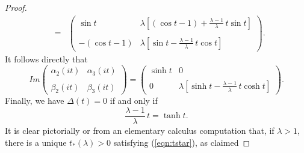\documentclass[12pt,reqno]{amsart}\usepackage{amssymb,amsmath,amscd,epsfig,amsthm,enumerate,import,eufrak}
\theoremstyle{definition}
\theoremstyle{remark}
\numberwithin{equation}{section}
\theoremstyle{plain}
\theoremstyle{definition}
\def \vs {\vskip 2mm}
\theoremstyle{remark}
\numberwithin{theorem}{section}
\begin{document}
\begin{proof}
\[\begin{array}{rcl}
		& = & \left(\begin{array}{cc} \sin  t & \lambda [(\cos t - 1) + \frac{\lambda - 1}{\lambda} \, t \sin t] \\ & \\ - (\cos t -1) & \lambda [\sin t - \frac{\lambda - 1}{\lambda} \, t \cos t] \end{array}\right). 
	\end{array}
\]
%
\vs
%
It follows directly that
%
\vs
%
\[ 
	Im \left(\begin{array}{cc} \alpha_2(i t) & \alpha_3(i t) \\ & \\ \beta_2(i t) & \beta_3(i t)\end{array}\right) = \left(\begin{array}{cc} \sinh t & 0 \\ & \\ 0 & \lambda [\sinh t - \frac{\lambda - 1}{\lambda} \, t \cosh t] \end{array}\right).
\]
%
\vs
%
Finally, we have $\Delta(t) = 0$ if and only if 
%
\vs
%
\begin{equation}\label{eqn:tstar}
	\frac{\lambda - 1}{\lambda} \, t = \tanh t.
\end{equation}
%
\vs
%
It is clear pictorially or from an elementary calculus computation that, if $\lambda >1$, there is a unique $t_*(\lambda) > 0$ satisfying (\ref{eqn:tstar}), as claimed
\end{proof}
%
%
%
%
%
%
%
%
%
%
%
%
\end{document}
